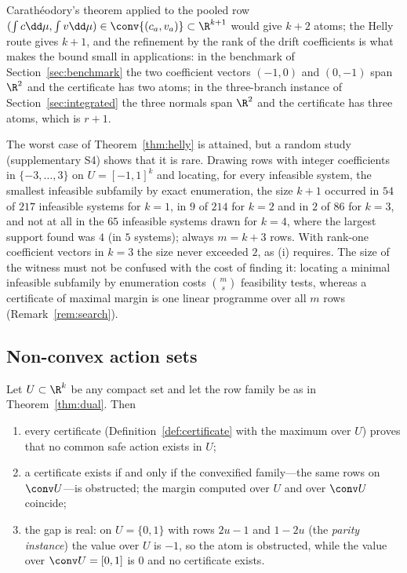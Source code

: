 Carath\'eodory's theorem applied to the pooled row $(\int c\dd\mu,\int v\dd\mu)\in\conv\{(c_a,v_a)\}\subset\R^{k+1}$ would give $k+2$ atoms; the Helly route gives $k+1$, and the refinement by the rank of the drift coefficients is what makes the bound small in applications: in the benchmark of Section~\ref{sec:benchmark} the two coefficient vectors $(-1,0)$ and $(0,-1)$ span $\R^2$ and the certificate has two atoms; in the three-branch instance of Section~\ref{sec:integrated} the three normals span $\R^2$ and the certificate has three atoms, which is $r+1$.

\begin{remark}\label{rem:random}
The worst case of Theorem~\ref{thm:helly} is attained, but a random study (supplementary S4) shows that it is rare. Drawing rows with integer coefficients in $\{-3,\dots,3\}$ on $U=[-1,1]^k$ and locating, for every infeasible system, the smallest infeasible subfamily by exact enumeration, the size $k+1$ occurred in $54$ of $217$ infeasible systems for $k=1$, in $9$ of $214$ for $k=2$ and in $2$ of $86$ for $k=3$, and not at all in the $65$ infeasible systems drawn for $k=4$, where the largest support found was $4$ (in $5$ systems); always $m=k+3$ rows. With rank-one coefficient vectors in $k=3$ the size never exceeded $2$, as (i) requires. The size of the witness must not be confused with the cost of finding it: locating a minimal infeasible subfamily by enumeration costs $\binom{m}{s}$ feasibility tests, whereas a certificate of maximal margin is one linear programme over all $m$ rows (Remark~\ref{rem:search}).
\end{remark}

\subsection{Non-convex action sets}

\begin{proposition}\label{prop:nonconvex}
Let $U\subset\R^k$ be any compact set and let the row family be as in Theorem~\ref{thm:dual}. Then
\begin{enumerate}[leftmargin=1.6em,itemsep=1pt]
\item[(i)] every certificate (Definition~\ref{def:certificate} with the maximum over $U$) proves that no common safe action exists in $U$;
\item[(ii)] a certificate exists if and only if the convexified family---the same rows on $\conv U$---is obstructed; the margin computed over $U$ and over $\conv U$ coincide;
\item[(iii)] the gap is real: on $U=\{0,1\}$ with rows $2u-1$ and $1-2u$ (the \emph{parity instance}) the value over $U$ is $-1$, so the atom is obstructed, while the value over $\conv U=[0,1]$ is $0$ and no certificate exists.
\end{enumerate}
\end{proposition}

